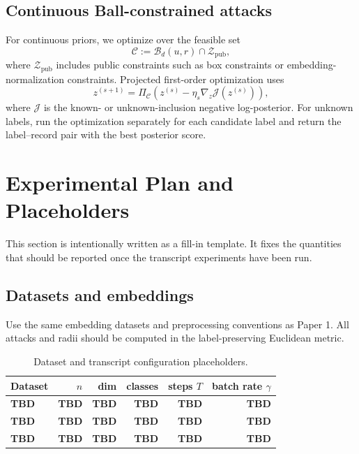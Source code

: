 \documentclass[conference,compsoc]{IEEEtran}
\newcommand{\cZ}{\mathcal{Z}}
\newcommand{\cB}{\mathcal{B}}
\newcommand{\cC}{\mathcal{C}}
\newcommand{\todoresult}{\textbf{TBD}}
\begin{document}
\subsection{Continuous Ball-constrained attacks}

For continuous priors, we optimize over the feasible set
\[
\cC:=\cB_d(u,r)\cap\cZ_{\mathrm{pub}},
\]
where $\cZ_{\mathrm{pub}}$ includes public constraints such as box constraints or embedding-normalization constraints. Projected first-order optimization uses
\[
z^{(s+1)}=\Pi_{\cC}\left(z^{(s)}-\eta_s\nabla_z\mathcal J(z^{(s)})\right),
\]
where $\mathcal J$ is the known- or unknown-inclusion negative log-posterior. For unknown labels, run the optimization separately for each candidate label and return the label--record pair with the best posterior score.

\section{Experimental Plan and Placeholders}
\label{sec:experiments}

This section is intentionally written as a fill-in template. It fixes the quantities that should be reported once the transcript experiments have been run.

\subsection{Datasets and embeddings}

Use the same embedding datasets and preprocessing conventions as Paper 1. All attacks and radii should be computed in the label-preserving Euclidean metric.

\begin{table}[t]
\centering
\caption{Dataset and transcript configuration placeholders.}
\label{tab:dataset-placeholders}
\begin{tabular}{lrrrrr}
\toprule
Dataset & $n$ & dim & classes & steps $T$ & batch rate $\gamma$\\
\midrule
\todoresult & \todoresult & \todoresult & \todoresult & \todoresult & \todoresult\\
\todoresult & \todoresult & \todoresult & \todoresult & \todoresult & \todoresult\\
\todoresult & \todoresult & \todoresult & \todoresult & \todoresult & \todoresult\\
\bottomrule
\end{tabular}
\end{table}
\end{document}
